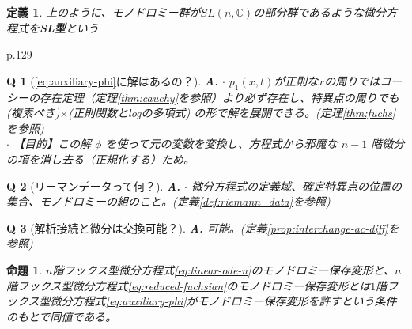 \documentclass[paper=a4, fontsize=11pt]{jlreq} %
\theoremstyle{break}
\newtheorem{definition}[theorem]{定義}
\newtheorem{proposition}[theorem]{命題}
\theoremstyle{qa}
\newtheorem*{Q}{Q}
\theoremstyle{remark} %
\begin{document}
\begin{definition}
    上のように、モノドロミー群が$SL(n,\mathbb{C})$の部分群であるような微分方程式を\textbf{SL型}という
\end{definition}

p.129
\begin{Q}[\eqref{eq:auxiliary-phi}に解はあるの？]
\textbf{A.} $\cdot$ $p_1(x,t)$が正則な$x$の周りではコーシーの存在定理（定理\ref{thm:cauchy}を参照）より必ず存在し、特異点の周りでも (複素べき)$\times$(正則関数とlogの多項式) の形で解を展開できる。(定理\ref{thm:fuchs}を参照)\\
$\cdot$ 【目的】この解 $\phi$ を使って元の変数を変換し、方程式から邪魔な $n-1$ 階微分の項を消し去る（正規化する）ため。
\end{Q}

\begin{Q}[リーマンデータって何？]
\textbf{A.} $\cdot$ 微分方程式の定義域、確定特異点の位置の集合、モノドロミーの組のこと。(定義\ref{def:riemann_data}を参照)\\
\end{Q}

\begin{Q}[解析接続と微分は交換可能？]
\textbf{A.} 可能。(定義\ref{prop:interchange-ac-diff}を参照)\\
\end{Q}

\begin{proposition}
    $n$階フックス型微分方程式\eqref{eq:linear-ode-n}のモノドロミー保存変形と、$n$階フックス型微分方程式\eqref{eq:reduced-fuchsian}のモノドロミー保存変形とは$1$階フックス型微分方程式\eqref{eq:auxiliary-phi}がモノドロミー保存変形を許すという条件のもとで同値である。
\end{proposition}%

\appendix
\end{document}

